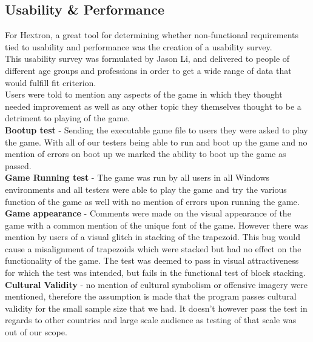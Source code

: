 \documentclass[12pt, titlepage]{article}
\begin{document}
\subsection{Usability \& Performance}

For Hextron, a great tool for determining whether non-functional requirements tied to usability and performance was the creation of a usability survey. \\

This usability survey was formulated by Jason Li, and delivered to people of different age groups and professions in order to get a wide range of data that would fulfill fit criterion. \\

Users were told to mention any aspects of the game in which they thought needed improvement as well as any other topic they themselves thought to be a detriment to playing of the game. \\

\textbf{Bootup test} - Sending the executable game file to users they were asked to play the game. With all of our testers being able to run and boot up the game and no mention of errors on boot up we marked the ability to boot up the game as passed.\\

\textbf{Game Running test} - The game was run by all users in all Windows environments and all testers were able to play the game and try the various function of the game as well with no mention of errors upon running the game.\\

\textbf{Game appearance} - Comments were made on the visual appearance of the game with a common mention of the unique font of the game. However there was mention by users of a visual glitch in stacking of the trapezoid. This bug would cause a misalignment of trapezoids which were stacked but had no effect on the functionality of the game. The test was deemed to pass in visual attractiveness for which the test was intended, but fails in the functional test of block stacking.\\

\textbf{Cultural Validity} - no mention of cultural symbolism or offensive imagery were mentioned, therefore the assumption is made that the program passes cultural validity for the small sample size that we had. It doesn't however pass the test in regards to other countries and large scale audience as testing of that scale was out of our scope.\\
\end{document}
